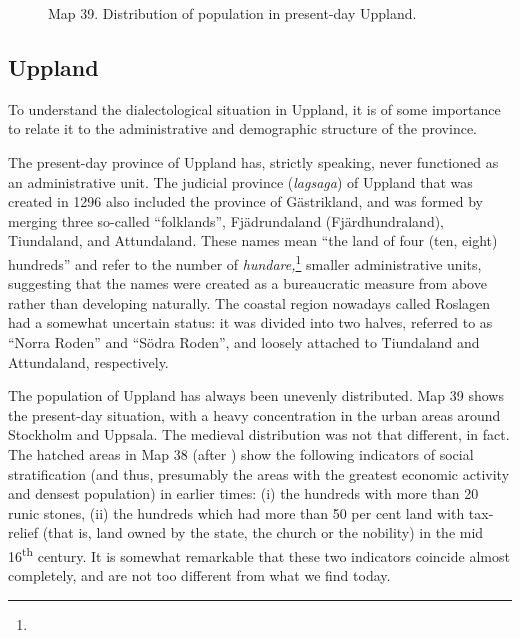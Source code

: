 \begin{figure}[h]

\begin{minipage}{2.6457in}

\begin{stylecaption}
Map 39. Distribution of population in present-day Uppland.

\end{stylecaption}

\end{minipage}

\end{figure}

\subsection{\rmfamily Uppland}

\begin{styleBodyTextFirst}
To understand the dialectological situation in Uppland, it is of some importance to relate it to the administrative and demographic structure of the province.

\end{styleBodyTextFirst}

\begin{styleBodytextC}
The present-day province of Uppland has, strictly speaking, never functioned as an administrative unit. The judicial province (\textit{lagsaga}) of Uppland that was created in 1296 also included the province of Gästrikland, and was formed by merging three so-called “folklands”, Fjädrundaland (Fjärdhundraland), Tiundaland, and Attundaland. These names mean “the land of four (ten, eight) hundreds” and refer to the number of \textit{hundare,}\footnote{} smaller administrative units, suggesting that the names were created as a bureaucratic measure from above rather than developing naturally. The coastal region nowadays called Roslagen had a somewhat uncertain status: it was divided into two halves, referred to as “Norra Roden” and “Södra Roden”, and loosely attached to Tiundaland and Attundaland, respectively. 

\end{styleBodytextC}

\begin{styleBodytextC}
The population of Uppland has always been unevenly distributed. Map 39 shows the present-day situation, with a heavy concentration in the urban areas around Stockholm and Uppsala. The medieval distribution was not that different, in fact. The hatched areas in Map 38 (after \citet{Broberg1990}) show the following indicators of social stratification (and thus, presumably the areas with the greatest economic activity and densest population) in earlier times: (i) the hundreds with more than 20 runic stones, (ii) the hundreds which had more than 50 per cent land with tax-relief (that is, land owned by the state, the church or the nobility) in the mid 16\textsuperscript{th} century. It is somewhat remarkable that these two indicators coincide almost completely, and are not too different from what we find today. 

\end{styleBodytextC}

